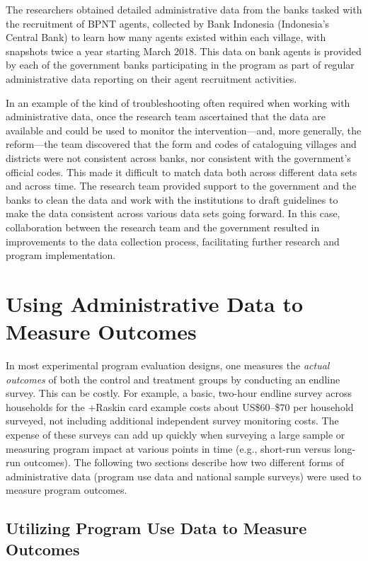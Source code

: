 \documentclass[
]{book}
\begin{document}
The researchers obtained detailed administrative data from the banks tasked with the recruitment of BPNT agents, collected by Bank Indonesia (Indonesia's Central Bank) to learn how many agents existed within each village, with snapshots twice a year starting March 2018. This data on bank agents is provided by each of the government banks participating in the program as part of regular administrative data reporting on their agent recruitment activities.

In an example of the kind of troubleshooting often required when working with administrative data, once the research team ascertained that the data are available and could be used to monitor the intervention---and, more generally, the reform---the team discovered that the form and codes of cataloguing villages and districts were not consistent across banks, nor consistent with the government's official codes. This made it difficult to match data both across different data sets and across time. The research team provided support to the government and the banks to clean the data and work with the institutions to draft guidelines to make the data consistent across various data sets going forward. In this case, collaboration between the research team and the government resulted in improvements to the data collection process, facilitating further research and program implementation.

\hypertarget{using-administrative-data-to-measure-outcomes}{%
\section{Using Administrative Data to Measure Outcomes}\label{using-administrative-data-to-measure-outcomes}}

In most experimental program evaluation designs, one measures the \emph{actual outcomes} of both the control and treatment groups by conducting an endline survey. This can be costly. For example, a basic, two-hour endline survey across households for the +Raskin\textbar{} card example costs about US\$60--\$70 per household surveyed, not including additional independent survey monitoring costs. The expense of these surveys can add up quickly when surveying a large sample or measuring program impact at various points in time (e.g., short-run versus long-run outcomes). The following two sections describe how two different forms of administrative data (program use data and national sample surveys) were used to measure program outcomes.

\hypertarget{utilizing-program-use-data-to-measure-outcomes}{%
\subsection{Utilizing Program Use Data to Measure Outcomes}\label{utilizing-program-use-data-to-measure-outcomes}}
\end{document}
